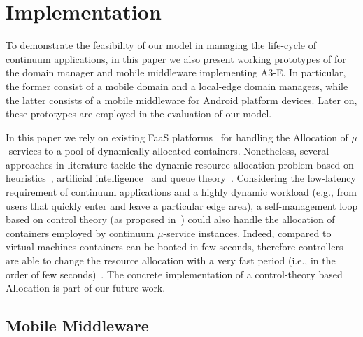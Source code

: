 \section{Implementation}\label{sec:implementation}


To demonstrate the feasibility of our model
in managing the life-cycle of continuum applications, in this paper we also present working prototypes of for the domain manager and mobile middleware implementing A3-E. In particular, the former consist of a mobile domain and a local-edge domain managers, while the latter consists of a mobile middleware for Android platform devices. Later on, these prototypes are employed in the evaluation of our model.

In this paper we rely on existing FaaS platforms~\cite{AWSLambda, OpenWhisk} for handling the Allocation of $\mu$-services to a pool of dynamically allocated containers. Nonetheless, several approaches in literature tackle the dynamic resource allocation problem based on heuristics~\cite{dustdar0}, artificial intelligence~\cite{ia1} and queue theory~\cite{queue1}. 
Considering the low-latency requirement of continuum applications and a highly dynamic workload  (e.g., from users that quickly enter and leave a particular edge area), a self-management loop based on control theory (as proposed in~\cite{Quatrocchi2016discrete}) could also handle the allocation of containers employed by continuum $\mu$-service instances. Indeed, compared to virtual machines containers can be booted in few seconds, therefore controllers are able to change the resource allocation with a very fast period (i.e., in the order of few seconds)~\cite{Quatrocchi2016discrete}. The concrete implementation of a control-theory based Allocation is part of our future work. 




\subsection{Mobile Middleware}~\label{sec:mobile_middleware}

